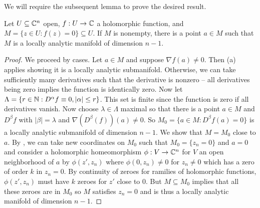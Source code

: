 We will require the subsequent lemma to prove the desired result. 
\begin{lemma}\label{lem: hypersurfaces are locally analytic submanifolds at a point}
    Let $U\subseteq\mathbb{C}^{n}$ open, $f:U\to\mathbb{C}$ a holomorphic function, and $M=\{z\in U:f(z)=0\}\subseteq U$. If $M$ is nonempty, there is a point $a\in M$ such that $M$ is a locally analytic manifold of dimension $n-1$.
\end{lemma}
\begin{proof}
    We proceed by cases. Let $a\in M$ and suppose $\nabla f(a)\neq0$. Then  (a) applies showing it is a locally analytic submanifold. Otherwise, we can take sufficiently many derivatives such that the derivative is nonzero -- all derivatives being zero implies the function is identically zero. Now let $\Lambda=\{r\in\mathbb{N}:D^{\alpha}f\equiv0, |\alpha|\leq r\}$. This set is finite since the function is zero if all derivatives vanish. Now choose $\lambda\in\Lambda$ maximal so that there is a point $a\in M$ and $D^{\beta}f$ with $|\beta|=\lambda$ and $\nabla(D^{\beta}(f))(a)\neq0$. So $M_{0}=\{a\in M:D^{\beta}f(a)=0\}$ is a locally analytic submanifold of dimension $n-1$. We show that $M=M_{0}$ close to $a$. By , we can take new coordinates on $M_{0}$ such that $M_{0}=\{z_{n}=0\}$ and $a=0$ and consider a holomorphic homeomorphism $\phi:V\to \mathbb{C}^{n}$ for $V$ an open neighborhood of $a$ by $\phi(z',z_{n})$ where $\phi(0,z_{n})\neq0$ for $z_{n}\neq0$ which has a zero of order $k$ in $z_{n}=0$. By continuity of zeroes for ramilies of holomorphic functions, $\phi(z',z_{n})$ must have $k$ zeroes for $z'$ close to 0. But $M\subseteq M_{0}$  implies that all these zeroes are in $M_{0}$ so $M$ satisfies $z_{n}=0$ and is thus a locally analytic manifold of dimension $n-1$. 
\end{proof}